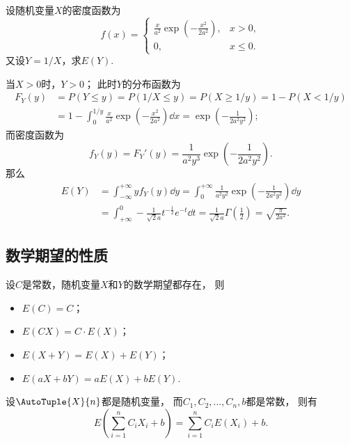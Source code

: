 \begin{example}
设随机变量\(X\)的密度函数为\[
	f(x) = \left\{ \begin{array}{cl}
		\frac{x}{a^2} \exp(-\frac{x^2}{2a^2}), & x>0, \\
		0, & x \leq 0.
	\end{array} \right.
\]
又设\(Y = 1/X\)，求\(E(Y)\).
\begin{solution}
当\(X>0\)时，\(Y>0\)；
此时\(Y\)的分布函数为\[\begin{aligned}
	F_Y(y)
	&= P(Y \leq y)
	= P(1/X \leq y)
	= P(X \geq 1/y)
	= 1 - P(X < 1/y) \\
	&= 1 - \int_0^{1/y} \frac{x}{a^2} \exp(-\frac{x^2}{2a^2}) \dd{x}
	= \exp(-\frac{1}{2a^2y^2});
\end{aligned}\]
而密度函数为\[
	f_Y(y) = F_Y'(y)
	= \frac{1}{a^2 y^3} \exp(-\frac{1}{2a^2y^2}).
\]
那么\begin{align*}
	E(Y)
	&= \int_{-\infty}^{+\infty} y f_Y(y) \dd{y}
	= \int_0^{+\infty} \frac{1}{a^2 y^2} \exp(-\frac{1}{2a^2y^2}) \dd{y} \\
	&= \int_{+\infty}^0 -\frac{1}{\sqrt{2} a} t^{-\frac{1}{2}} e^{-t} \dd{t}
	= \frac{1}{\sqrt{2} a} \Gamma\left(\frac{1}{2}\right)
	= \sqrt{\frac{\pi}{2a^2}}.
\end{align*}
\end{solution}
\end{example}

\subsection{数学期望的性质}
\begin{property}\label{theorem:随机变量的数字特征.数学期望的性质1}
设\(C\)是常数，随机变量\(X\)和\(Y\)的数学期望都存在，
则\begin{itemize}
	\item \(E(C) = C\)；
	\item \(E(C X) = C \cdot E(X)\)；
	\item \(E(X + Y) = E(X) + E(Y)\)；
	\item \(E(aX+bY) = a E(X) + b E(Y)\).
\end{itemize}
\end{property}

\begin{property}[线性性质]\label{theorem:随机变量的数字特征.数学期望的性质2}
设\(\AutoTuple{X}{n}\)都是随机变量，
而\(C_1,C_2,\dotsc,C_n,b\)都是常数，
则有\[
	E\left(\sum_{i=1}^n C_i X_i + b\right)
	=\sum_{i=1}^n C_i E(X_i) + b.
\]
\end{property}

